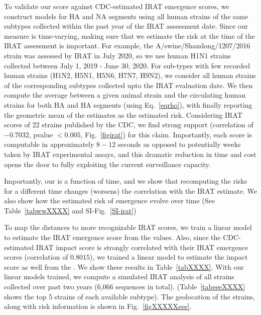 \documentclass[onecolumn, compsoc,10pt]{IEEEtran}
\begin{document}
To validate our score against CDC-estimated IRAT emergence scores, we construct \enet models for HA and NA segments using all human strains of the same  subtypes collected within the past year of the IRAT assessment date. Since our measure is time-varying, making sure that we estimate the risk at the time of the IRAT assessment is important. For example, the A/swine/Shandong/1207/2016 strain was assessed by IRAT in July 2020, so we  use human H1N1 strains collected  between July 1, 2019 - June 30, 2020. For sub-types with few recorded human strains (H1N2, H5N1, H5N6, H7N7, H9N2), we consider all human strains of the corresponding subtypes collected upto the IRAT evaluation date. We then compute the average \qdist between a given animal  strain  and the circulating human strains for both HA and HA segments (using Eq.~\eqref{eqrho}), with finally reporting the geometric mean of the estimates as the estimated risk. Considering IRAT scores of 22 strains published by the CDC, we find strong support  (correlation of $-0.7032$, pvalue $< 0.005$, Fig.~\ref{figirat}) for this claim. Importantly, each \erisk score  is  computable in approximately $8-12$ seconds as opposed to potentially weeks taken by IRAT experimental assays, and this dramatic reduction in time and cost  opens the door to fully exploiting the  current surveillance capacity.

Importantly, our \erisk is a function of time, and
we show that recomputing the risks for a different time changes (worsens) the correlation with the IRAT estimate. We also show how the estimated  risk of emergence evolve over time (See Table~\ref{tabwwXXXX}  and SI-Fig.~\ref{SI-irat})

To map the \enet distances to more recognizable IRAT scores, we  train a linear model to estimate the IRAT emergence score from the \erisk values. Also, since the CDC-estimated IRAT impact score is strongly correlated with their IRAT emergence scores (correlation of $0.8015$), we  trained a linear model to estimate the impact score as well from the  \erisk. We show these results in Table~\ref{tabXXXX}. With our linear models trained, we compute a simulated IRAT analysis of all \infl strains collected over past two years (6,066 sequences in total). (Table~\ref{tabeeeXXXX} shows the top 5 strains of each available subtype). The geolocation of the strains, along with risk information is shown in Fig.~\ref{figXXXXXeee}.


\end{document}
